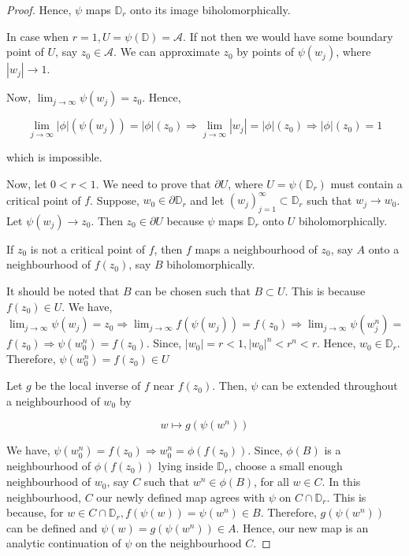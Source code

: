 \begin{proof}
Hence, $\psi$ maps $\mathbb{D}_{r}$ onto its image biholomorphically.

In case when $r=1, U=\psi(\mathbb{D})=\mathcal{A}$. If not then we would have some boundary point of $U$, say $z_{0} \in \mathcal{A}$. We can approximate $z_{0}$ by points of $\psi\left(w_{j}\right)$, where $\left|w_{j}\right| \rightarrow 1$.

Now, $\lim _{j \rightarrow \infty} \psi\left(w_{j}\right)=z_{0}$. Hence,

$$
\lim _{j \rightarrow \infty}|\phi|\left(\psi\left(w_{j}\right)\right)=|\phi|\left(z_{0}\right) \Longrightarrow \lim _{j \rightarrow \infty}\left|w_{j}\right|=|\phi|\left(z_{0}\right) \Longrightarrow|\phi|\left(z_{0}\right)=1
$$

which is impossible.

Now, let $0<r<1$. We need to prove that $\partial U$, where $U=\psi\left(\mathbb{D}_{r}\right)$ must contain a critical point of $f$. Suppose, $w_{0} \in \partial \mathbb{D}_{r}$ and let $\left(w_{j}\right)_{j=1}^{\infty} \subset \mathbb{D}_{r}$ such that $w_{j} \rightarrow w_{0}$. Let $\psi\left(w_{j}\right) \rightarrow z_{0}$. Then $z_{0} \in \partial U$ because $\psi$ maps $\mathbb{D}_{r}$ onto $U$ biholomorphically.

If $z_{0}$ is not a critical point of $f$, then $f$ maps a neighbourhood of $z_{0}$, say $A$ onto a neighbourhood of $f\left(z_{0}\right)$, say $B$ biholomorphically.

It should be noted that $B$ can be chosen such that $B \subset U$. This is because $f\left(z_{0}\right) \in U$. We have, $\lim _{j \rightarrow \infty} \psi\left(w_{j}\right)=z_{0} \Longrightarrow \lim _{j \rightarrow \infty} f\left(\psi\left(w_{j}\right)\right)=f\left(z_{0}\right) \Longrightarrow \lim _{j \rightarrow \infty} \psi\left(w_{j}^{n}\right)=$ $f\left(z_{0}\right) \Longrightarrow \psi\left(w_{0}^{n}\right)=f\left(z_{0}\right)$. Since, $\left|w_{0}\right|=r<1,\left|w_{0}\right|^{n}<r^{n}<r$. Hence, $w_{0} \in \mathbb{D}_{r}$. Therefore, $\psi\left(w_{0}^{n}\right)=f\left(z_{0}\right) \in U$

Let $g$ be the local inverse of $f$ near $f\left(z_{0}\right)$. Then, $\psi$ can be extended throughout a neighbourhood of $w_{0}$ by

$$
w \mapsto g\left(\psi\left(w^{n}\right)\right)
$$

We have, $\psi\left(w_{0}^{n}\right)=f\left(z_{0}\right) \Longrightarrow w_{0}^{n}=\phi\left(f\left(z_{0}\right)\right)$. Since, $\phi(B)$ is a neighbourhood of $\phi\left(f\left(z_{0}\right)\right)$ lying inside $\mathbb{D}_{r}$, choose a small enough neighbourhood of $w_{0}$, say $C$ such that $w^{n} \in \phi(B)$, for all $w \in C$. In this neighbourhood, $C$ our newly defined map agrees with $\psi$ on $C \cap \mathbb{D}_{r}$. This is because, for $w \in C \cap \mathbb{D}_{r}, f(\psi(w))=\psi\left(w^{n}\right) \in B$. Therefore, $g\left(\psi\left(w^{n}\right)\right)$ can be defined and $\psi(w)=g\left(\psi\left(w^{n}\right)\right) \in A$. Hence, our new map is an analytic continuation of $\psi$ on the neighbourhood $C$.


\end{proof}
